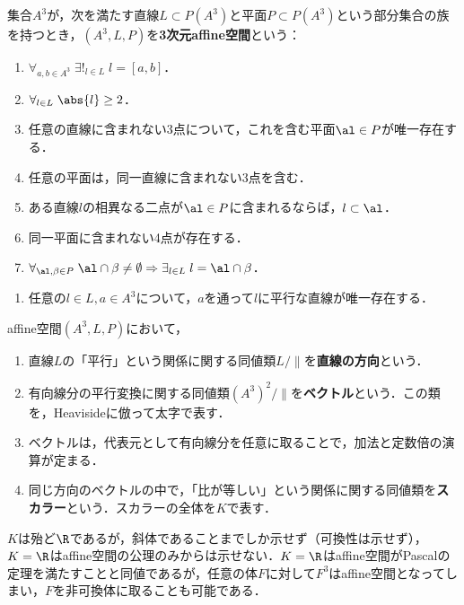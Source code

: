 \documentclass[uplatex,dvipdfmx]{jsreport}
\begin{document}
\begin{axiom}
    集合$A^3$が，次を満たす直線$L\subset P(A^3)$と平面$P\subset P(A^3)$という部分集合の族を持つとき，$(A^3,L,P)$を\textbf{3次元affine空間}という：
    \begin{enumerate}[({I.}1)]
        \item $\forall_{a,b\in A^3}\;\exists!_{l\in L}\;l=[a,b]$．
        \item $\forall_{l\in L}\;\abs{l}\ge2$．
        \item 任意の直線に含まれない3点について，これを含む平面$\al\in P$が唯一存在する．
        \item 任意の平面は，同一直線に含まれない3点を含む．
        \item ある直線$l$の相異なる二点が$\al\in P$に含まれるならば，$l\subset\al$．
        \item 同一平面に含まれない4点が存在する．
        \item $\forall_{\al,\beta\in P}\;\al\cap\beta\ne\emptyset\Rightarrow\exists_{l\in L}\;l=\al\cap\beta$．
    \end{enumerate}
    \begin{enumerate}[({II.}1)]
        \item 任意の$l\in L,a\in A^3$について，$a$を通って$l$に平行な直線が唯一存在する．
    \end{enumerate}
\end{axiom}

\begin{definition}
    affine空間$(A^3, L, P)$において，
    \begin{enumerate}
        \item 直線$L$の「平行」という関係に関する同値類$L/\parallel$を\textbf{直線の方向}という．
        \item 有向線分の平行変換に関する同値類$(A^3)^2/\parallel$を\textbf{ベクトル}という．この類を，Heavisideに倣って太字で表す．
        \item ベクトルは，代表元として有向線分を任意に取ることで，加法と定数倍の演算が定まる．
        \item 同じ方向のベクトルの中で，「比が等しい」という関係に関する同値類を\textbf{スカラー}という．スカラーの全体を$K$で表す．
    \end{enumerate}
\end{definition}
\begin{remark}
    $K$は殆ど$\R$であるが，斜体であることまでしか示せず（可換性は示せず），$K=\R$はaffine空間の公理のみからは示せない．$K=\R$はaffine空間がPascalの定理を満たすことと同値であるが，任意の体$F$に対して$F^3$はaffine空間となってしまい，$F$を非可換体に取ることも可能である．
\end{remark}
\end{document}

